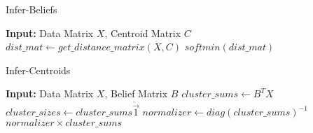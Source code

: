 \begin{minipage}[t]{8cm}
  \vspace{0pt}  
  \begin{algorithm}[H]
    \caption{Infer-Beliefs}
    \begin{algorithmic}[1]
    \State \textbf{Input:} Data Matrix $X$, Centroid Matrix $C$
    \State $dist\_mat \gets get\_distance\_matrix(X,C)$
    \State \Return $softmin(dist\_mat)$
    \end{algorithmic}
  \end{algorithm}
\end{minipage}%
\begin{minipage}[t]{7cm}
  \vspace{0pt}
  \begin{algorithm}[H]
    \caption{Infer-Centroids}
    \begin{algorithmic}[1]
    \State \textbf{Input:} Data Matrix $X$, Belief Matrix $B$
    \State $cluster\_sums \gets B^T X $
    \State $cluster\_sizes \gets cluster\_sums\dot\vec{1} $
    \State $normalizer \gets diag(cluster\_sums)^{-1}$
    \State \Return $ normalizer\times{cluster\_sums}$
    \end{algorithmic}
  \end{algorithm}
  
\end{minipage}
